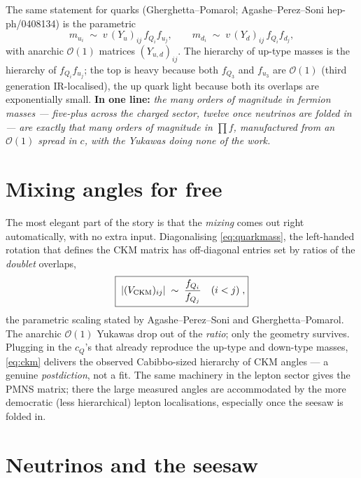 \documentclass[11pt]{article}
\newcommand{\vev}{v}
\theoremstyle{definition}
\begin{document}
The same statement for quarks (Gherghetta--Pomarol; Agashe--Perez--Soni
hep-ph/0408134) is the parametric
\begin{equation}
m_{u_i}\;\sim\;\vev\,(Y_u)_{ij}\,f_{Q_i}f_{u_j},\qquad
m_{d_i}\;\sim\;\vev\,(Y_d)_{ij}\,f_{Q_i}f_{d_j},
\label{eq:quarkmass}
\end{equation}
with anarchic $\mathcal{O}(1)$ matrices $(Y_{u,d})_{ij}$. The hierarchy of up-type
masses is the hierarchy of $f_{Q_i}f_{u_j}$; the top is heavy because both $f_{Q_3}$
and $f_{u_3}$ are $\mathcal{O}(1)$ (third generation IR-localised), the up quark
light because both its overlaps are exponentially small. \textbf{In one line:}
\emph{the many orders of magnitude in fermion masses --- five-plus across the
charged sector, twelve once neutrinos are folded in --- are exactly that many
orders of magnitude in $\prod f$, manufactured from an $\mathcal{O}(1)$ spread in
$c$, with the Yukawas doing none of the work.}

\section{Mixing angles for free}
\label{sec:mixing}

The most elegant part of the story is that the \emph{mixing} comes out right
automatically, with no extra input. Diagonalising \eqref{eq:quarkmass}, the
left-handed rotation that defines the CKM matrix has off-diagonal entries set by
ratios of the \emph{doublet} overlaps,
\begin{equation}
\boxed{\;|(V_{\rm CKM})_{ij}| \;\sim\; \frac{f_{Q_i}}{f_{Q_j}}\quad (i<j)\;,}
\label{eq:ckm}
\end{equation}
the parametric scaling stated by Agashe--Perez--Soni and Gherghetta--Pomarol. The
anarchic $\mathcal{O}(1)$ Yukawas drop out of the \emph{ratio}; only the geometry
survives. Plugging in the $c_Q$'s that already reproduce the up-type and down-type
masses, \eqref{eq:ckm} delivers the observed Cabibbo-sized hierarchy of CKM angles
--- a genuine \emph{postdiction}, not a fit. The same machinery in the lepton
sector gives the PMNS matrix; there the large measured angles are accommodated by
the more democratic (less hierarchical) lepton localisations, especially once the
seesaw is folded in.

\section{Neutrinos and the seesaw}
\label{sec:seesaw}
\end{document}
